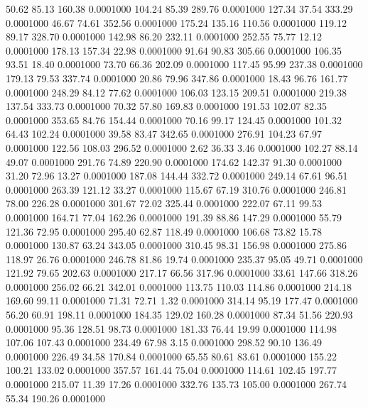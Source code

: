  50.62   85.13  160.38   0.0001000
 104.24   85.39  289.76   0.0001000
 127.34   37.54  333.29   0.0001000
  46.67   74.61  352.56   0.0001000
 175.24  135.16  110.56   0.0001000
 119.12   89.17  328.70   0.0001000
 142.98   86.20  232.11   0.0001000
 252.55   75.77   12.12   0.0001000
 178.13  157.34   22.98   0.0001000
  91.64   90.83  305.66   0.0001000
 106.35   93.51   18.40   0.0001000
  73.70   66.36  202.09   0.0001000
 117.45   95.99  237.38   0.0001000
 179.13   79.53  337.74   0.0001000
  20.86   79.96  347.86   0.0001000
  18.43   96.76  161.77   0.0001000
 248.29   84.12   77.62   0.0001000
 106.03  123.15  209.51   0.0001000
 219.38  137.54  333.73   0.0001000
  70.32   57.80  169.83   0.0001000
 191.53  102.07   82.35   0.0001000
 353.65   84.76  154.44   0.0001000
  70.16   99.17  124.45   0.0001000
 101.32   64.43  102.24   0.0001000
  39.58   83.47  342.65   0.0001000
 276.91  104.23   67.97   0.0001000
 122.56  108.03  296.52   0.0001000
   2.62   36.33    3.46   0.0001000
 102.27   88.14   49.07   0.0001000
 291.76   74.89  220.90   0.0001000
 174.62  142.37   91.30   0.0001000
  31.20   72.96   13.27   0.0001000
 187.08  144.44  332.72   0.0001000
 249.14   67.61   96.51   0.0001000
 263.39  121.12   33.27   0.0001000
 115.67   67.19  310.76   0.0001000
 246.81   78.00  226.28   0.0001000
 301.67   72.02  325.44   0.0001000
 222.07   67.11   99.53   0.0001000
 164.71   77.04  162.26   0.0001000
 191.39   88.86  147.29   0.0001000
  55.79  121.36   72.95   0.0001000
 295.40   62.87  118.49   0.0001000
 106.68   73.82   15.78   0.0001000
 130.87   63.24  343.05   0.0001000
 310.45   98.31  156.98   0.0001000
 275.86  118.97   26.76   0.0001000
 246.78   81.86   19.74   0.0001000
 235.37   95.05   49.71   0.0001000
 121.92   79.65  202.63   0.0001000
 217.17   66.56  317.96   0.0001000
  33.61  147.66  318.26   0.0001000
 256.02   66.21  342.01   0.0001000
 113.75  110.03  114.86   0.0001000
 214.18  169.60   99.11   0.0001000
  71.31   72.71    1.32   0.0001000
 314.14   95.19  177.47   0.0001000
  56.20   60.91  198.11   0.0001000
 184.35  129.02  160.28   0.0001000
  87.34   51.56  220.93   0.0001000
  95.36  128.51   98.73   0.0001000
 181.33   76.44   19.99   0.0001000
 114.98  107.06  107.43   0.0001000
 234.49   67.98    3.15   0.0001000
 298.52   90.10  136.49   0.0001000
 226.49   34.58  170.84   0.0001000
  65.55   80.61   83.61   0.0001000
 155.22  100.21  133.02   0.0001000
 357.57  161.44   75.04   0.0001000
 114.61  102.45  197.77   0.0001000
 215.07   11.39   17.26   0.0001000
 332.76  135.73  105.00   0.0001000
 267.74   55.34  190.26   0.0001000
